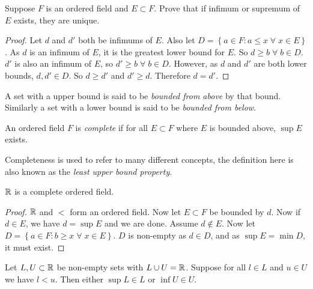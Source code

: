 \begin{proposition}[]
	Suppose $F$ is an ordered field and $E \subset F$.
	Prove that if infimum or supremum of $E$ exists, they are unique.
\end{proposition}

\begin{proof}
	Let $d$ and $d'$ both be infimums of $E$.
	Also let $D = \left\{ a \in F: a \leq x \;\forall\; x \in E \right\}$.
	As $d$ is an infimum of $E$, it is the greatest lower bound for $E$.
	So $d \geq b \;\forall\; b \in D$. 
	$d'$ is also an infimum of $E$, so $d' \geq b \;\forall\; b \in D$.
	However, as $d$ and $d'$ are both lower bounds, $d, d' \in D$.
	So $d \geq d'$ and $d' \geq d$.
	Therefore $d = d'$.
\end{proof}

\begin{definition}[Bounded]
	A set with a upper bound is said to be \emph{bounded from above} by that
	bound. Similarly a set with a lower bound is said to be \emph{bounded 
	from below}.
\end{definition}

\begin{definition}[Complete]
	An ordered field $F$ is \emph{complete} if for all $E \subset F$ where
	$E$ is bounded above, $\sup E$ exists.
\end{definition}

Completeness is used to refer to many different concepts,
the definition here is also known as the \emph{least upper bound property}.

\begin{proposition}[]
	$\mathbb{R}$ is a complete ordered field.
\end{proposition}

\begin{proof}
	$\mathbb{R}$ and $<$ form an ordered field.
	Now let $E \subset F$ be bounded by $d$.
	Now if $d \in E$, we have $d = \sup E$ and we are done.
	Assume $d \not\in E$.
	Now let $D = \left\{ a \in F: b \geq x \;\forall\; x \in E \right\}$.
	$D$ is non-empty as $d \in D$, and as $\sup E = \min D$, it must exist.
\end{proof}

\begin{proposition}
	Let $L, U \subset \mathbb{R}$ be non-empty sets with $L \cup U = \mathbb{R}$.
	Suppose for all $l \in L$ and $u \in U$ we have $l < u$.
	Then either $\sup L \in L$ or $\inf U \in U$.
\end{proposition}

